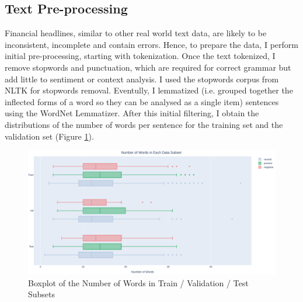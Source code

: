\documentclass[final]{cvpr}
\begin{document}


\subsection{Text Pre-processing}

Financial headlines, similar to other real world text data, are likely to be inconsistent, incomplete and contain errors. Hence, to prepare the data, I perform initial pre-processing, starting with tokenization. Once the text tokenized, I remove stopwords and punctuation, which are required for correct grammar but add little to sentiment or context analysis. I used the stopwords corpus from NLTK for stopwords removal. Eventully, I lemmatized (i.e. grouped together the inflected forms of a word so they can be analysed as a single item) sentences using the WordNet Lemmatizer. After this initial filtering, I obtain the distributions of the number of words per sentence for the training set and the validation set (Figure \ref{fig:stopwords}).

\begin{figure}[t!]
	\centering
	\includegraphics[width=1.05\textwidth]{fig/number_of_words.pdf}
	\caption{Boxplot of the Number of Words in Train / Validation / Test Subsets}
	\label{fig:stopwords}
\end{figure}

\end{document}
